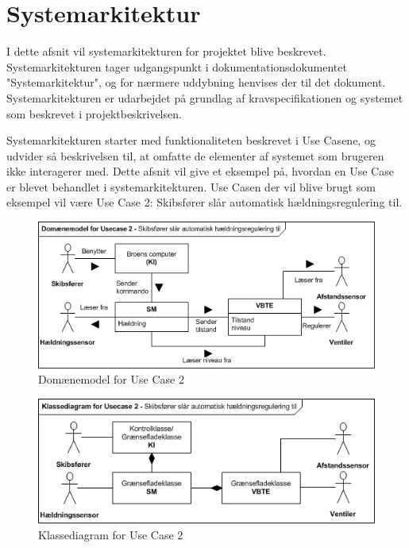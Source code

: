 \section{Systemarkitektur}
I dette afsnit vil systemarkitekturen for projektet blive beskrevet. Systemarkitekturen tager udgangspunkt i dokumentationsdokumentet "Systemarkitektur", og for nærmere uddybning henvises der til det dokument. 
Systemarkitekturen er udarbejdet på grundlag af kravspecifikationen og systemet som beskrevet i projektbeskrivelsen.

Systemarkitekturen starter med funktionaliteten beskrevet i Use Casene, og udvider så beskrivelsen til, at omfatte de elementer af systemet som brugeren ikke interagerer med. Dette afsnit vil give et eksempel på, hvordan en Use Case er blevet behandlet i systemarkitekturen. Use Casen der vil blive brugt som eksempel vil være Use Case 2: Skibsfører slår automatisk hældningsregulering til.

\begin{figure}[H]
\centering
\includegraphics[scale=0.8]{billeder/Systemarkitektur/DM_UC2}
\caption{Domænemodel for Use Case 2}
\label{fig:dmuc2}
\end{figure}

\begin{figure}[H]
\centering
\includegraphics[scale=0.8]{billeder/Systemarkitektur/KD_UC2}
\caption{Klassediagram for Use Case 2}
\label{fig:kduc2}
\end{figure}

